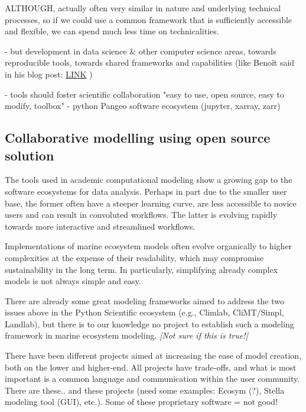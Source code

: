 \documentclass[journal abbreviations, manuscript]{copernicus}
\begin{document}
ALTHOUGH, actually often very similar in nature and underlying technical processes, so if we could use a common framework that is sufficiently accessible and flexible, we can spend much less time on technicalities.

- but development in data science \& other computer science areas, towards reproducible tools, towards shared frameworks and capabilities (like Benoît said in his blog post: \href{https://medium.com/pangeo/pangeo-data-and-models-280b251ff0cd}{LINK} )

- tools should foster scientific collaboration
"easy to use, open source, easy to modify, toolbox"
- python Pangeo software ecosystem (jupyter, xarray, zarr)



\subsection{Collaborative modelling using open source solution}


The tools used in academic computational modeling show a growing gap to the software ecosystems for data analysis. Perhaps in part due to the smaller user base, the former often have a steeper learning curve, are less accessible to novice users and can result in convoluted workflows. The latter is evolving rapidly towards more interactive and streamlined workflows.

Implementations of marine ecosystem models often evolve organically to higher complexities at the expense of their readability, which may compromise sustainability in the long term. In particularly, simplifying already complex models is not always simple and easy.

There are already some great modeling frameworks aimed to address the two issues above in the Python Scientific ecosystem (e.g., Climlab, CliMT/Simpl, Landlab), but there is to our knowledge no project to establish such a modeling framework in marine ecosystem modeling. \textit{[Not sure if this is true!]}


There have been different projects aimed at increasing the ease of model creation, both on the lower and higher-end. All projects have trade-offs, and what is most important is a common language and communication within the user community.
There are these.. and these projects (need some examples: Ecosym (?), Stella modeling tool (GUI), etc.).
Some of these proprietary software = not good!
\end{document}
